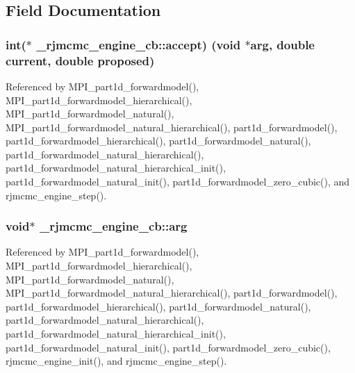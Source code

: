 \subsection{Field Documentation}
\subsubsection[{\texorpdfstring{accept}{accept}}]{\setlength{\rightskip}{0pt plus 5cm}int($\ast$ \+\_\+rjmcmc\+\_\+engine\+\_\+cb\+::accept) (void $\ast${\bf arg}, double current, double proposed)}\hypertarget{struct__rjmcmc__engine__cb_ab76b8decf72beb07f5cbd5354873c075}{}\label{struct__rjmcmc__engine__cb_ab76b8decf72beb07f5cbd5354873c075}


Referenced by M\+P\+I\+\_\+part1d\+\_\+forwardmodel(), M\+P\+I\+\_\+part1d\+\_\+forwardmodel\+\_\+hierarchical(), M\+P\+I\+\_\+part1d\+\_\+forwardmodel\+\_\+natural(), M\+P\+I\+\_\+part1d\+\_\+forwardmodel\+\_\+natural\+\_\+hierarchical(), part1d\+\_\+forwardmodel(), part1d\+\_\+forwardmodel\+\_\+hierarchical(), part1d\+\_\+forwardmodel\+\_\+natural(), part1d\+\_\+forwardmodel\+\_\+natural\+\_\+hierarchical(), part1d\+\_\+forwardmodel\+\_\+natural\+\_\+hierarchical\+\_\+init(), part1d\+\_\+forwardmodel\+\_\+natural\+\_\+init(), part1d\+\_\+forwardmodel\+\_\+zero\+\_\+cubic(), and rjmcmc\+\_\+engine\+\_\+step().

\subsubsection[{\texorpdfstring{arg}{arg}}]{\setlength{\rightskip}{0pt plus 5cm}void$\ast$ \+\_\+rjmcmc\+\_\+engine\+\_\+cb\+::arg}\hypertarget{struct__rjmcmc__engine__cb_aea2c810aeae4815b886e2252c9bca337}{}\label{struct__rjmcmc__engine__cb_aea2c810aeae4815b886e2252c9bca337}


Referenced by M\+P\+I\+\_\+part1d\+\_\+forwardmodel(), M\+P\+I\+\_\+part1d\+\_\+forwardmodel\+\_\+hierarchical(), M\+P\+I\+\_\+part1d\+\_\+forwardmodel\+\_\+natural(), M\+P\+I\+\_\+part1d\+\_\+forwardmodel\+\_\+natural\+\_\+hierarchical(), part1d\+\_\+forwardmodel(), part1d\+\_\+forwardmodel\+\_\+hierarchical(), part1d\+\_\+forwardmodel\+\_\+natural(), part1d\+\_\+forwardmodel\+\_\+natural\+\_\+hierarchical(), part1d\+\_\+forwardmodel\+\_\+natural\+\_\+hierarchical\+\_\+init(), part1d\+\_\+forwardmodel\+\_\+natural\+\_\+init(), part1d\+\_\+forwardmodel\+\_\+zero\+\_\+cubic(), rjmcmc\+\_\+engine\+\_\+init(), and rjmcmc\+\_\+engine\+\_\+step().

